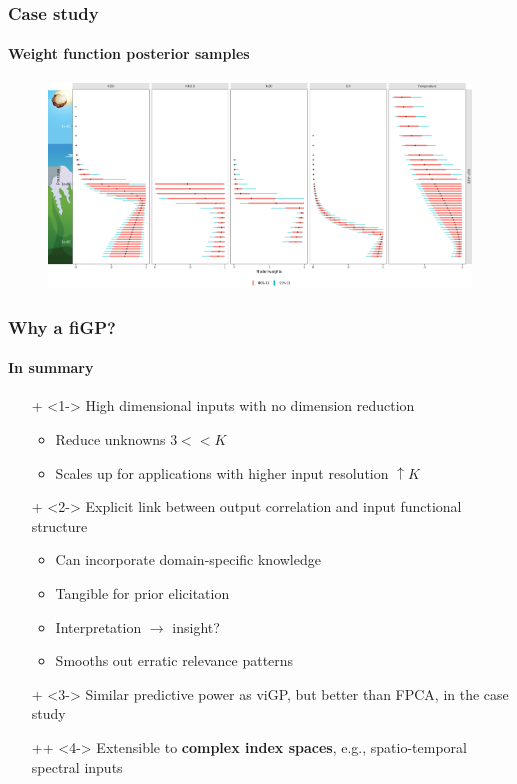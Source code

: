 \documentclass{snedecorbeamer}
\begin{document}
\begin{frame}
  \frametitle{Case study}
  \framesubtitle{Weight function posterior samples}

  \begin{figure}
    \centering
    \includegraphics[width=1\textwidth]{image2934-8.png}
  \end{figure}
\end{frame}

\begin{frame}
  \frametitle{Why a fiGP?}
  \framesubtitle{In summary}

  \begin{itemize}
  \item[+]<1-> High dimensional inputs with no dimension reduction
    \begin{itemize}
    \item Reduce unknowns $3 << K$
    \item Scales up for applications with higher input resolution
      $\uparrow K$
    \end{itemize}
  \item[+]<2-> Explicit link between output correlation and
    input functional structure
    \begin{itemize}
    \item<2-> Can incorporate domain-specific knowledge
    \item<2-> Tangible for prior elicitation
    \item<2-> Interpretation $\to$ insight?
    \item<2-> Smooths out erratic relevance patterns
    \end{itemize}
  \item[+]<3-> Similar predictive power as viGP, but better than FPCA, in the
    case study
  \item[++]<4-> Extensible to \alert{\textbf{complex
        index spaces}}, e.g., spatio-temporal spectral inputs
  \end{itemize}
\end{frame}
\end{document}
